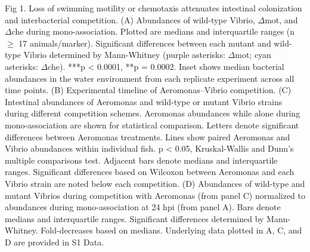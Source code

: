 Fig 1. Loss of swimming motility or chemotaxis attenuates intestinal colonization and interbacterial competition.
(A) Abundances of wild-type Vibrio, $\Delta$mot, and $\Delta$che during mono-association. Plotted are medians and interquartile ranges (n $\ge$ 17 animals/marker). Significant differences between each mutant and wild-type Vibrio determined by Mann-Whitney (purple asterisks: $\Delta$mot; cyan asterisks: $\Delta$che). ***p < 0.0001, **p = 0.0002. Inset shows median bacterial abundances in the water environment from each replicate experiment across all time points. (B) Experimental timeline of Aeromonas–Vibrio competition. (C) Intestinal abundances of Aeromonas and wild-type or mutant Vibrio strains during different competition schemes. Aeromonas abundances while alone during mono-association are shown for statistical comparison. Letters denote significant differences between Aeromonas treatments. Lines show paired Aeromonas and Vibrio abundances within individual fish. p < 0.05, Kruskal-Wallis and Dunn's multiple comparisons test. Adjacent bars denote medians and interquartile ranges. Significant differences based on Wilcoxon between Aeromonas and each Vibrio strain are noted below each competition. (D) Abundances of wild-type and mutant Vibrios during competition with Aeromonas (from panel C) normalized to abundances during mono-association at 24 hpi (from panel A). Bars denote medians and interquartile ranges. Significant differences determined by Mann-Whitney. Fold-decreases based on medians. Underlying data plotted in A, C, and D are provided in S1 Data. 

